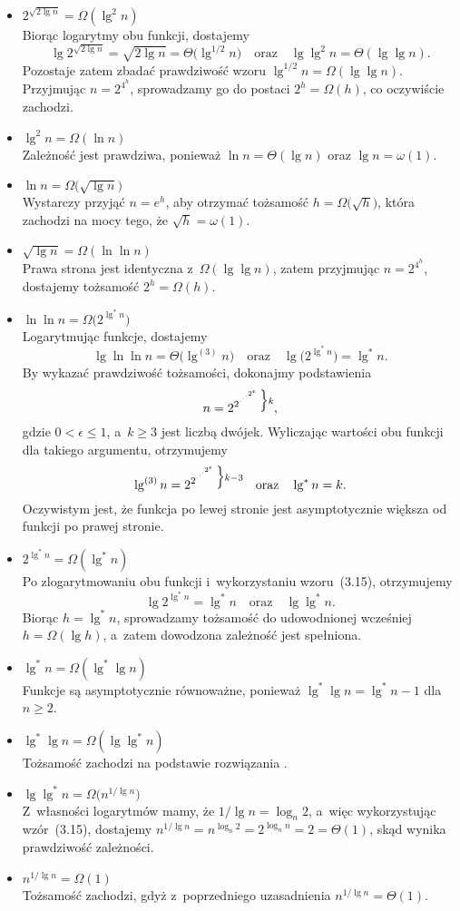 \begin{itemize}
\item $2^{\sqrt{2\lg n}}=\Omega(\lg^2 n)$ \\
	Biorąc logarytmy obu funkcji, dostajemy
	\[
		\lg2^{\sqrt{2\lg n}} = \sqrt{2\lg n} = \Theta\bigl(\lg^{1/2}n\bigr) \quad\text{oraz}\quad \lg\lg^2n = \Theta(\lg\lg n).
	\]
	Pozostaje zatem zbadać prawdziwość wzoru $\lg^{1/2}n=\Omega(\lg\lg n)$. Przyjmując $n=2^{4^h}$, sprowadzamy go do postaci $2^h=\Omega(h)$, co oczywiście zachodzi.
\item $\lg^2n=\Omega(\ln n)$ \\
	Zależność jest prawdziwa, ponieważ $\ln n=\Theta(\lg n)$ oraz $\lg n=\omega(1)$.
\item $\ln n=\Omega\bigl(\!\sqrt{\lg n}\bigr)$ \\
	Wystarczy przyjąć $n=e^h$, aby otrzymać tożsamość $h=\Omega\bigl(\!\sqrt{h}\bigr)$, która zachodzi na mocy tego, że $\sqrt{h}=\omega(1)$.
\item $\sqrt{\lg n}=\Omega(\ln\ln n)$ \\
	Prawa strona jest identyczna z~$\Omega(\lg\lg n)$, zatem przyjmując $n=2^{4^h}$, dostajemy tożsamość $2^h=\Omega(h)$.
\item $\ln\ln n=\Omega\bigl(2^{\lg^*n}\bigr)$ \\
	Logarytmując funkcje, dostajemy
	\[
		\lg\ln\ln n = \Theta\bigl(\lg^{(3)}n\bigr) \quad\text{oraz}\quad \lg\bigl(2^{\lg^*n}\bigr) = \lg^*n.
	\]
	By wykazać prawdziwość tożsamości, dokonajmy podstawienia
	\[
		n = 2^{2^{\cdot^{\cdot^{\cdot^{2^\epsilon}}}}}\vbox{\hbox{$\Big\}\scriptstyle k$}\kern0pt},
	\]
	gdzie $0<\epsilon\le1$, a~$k\ge3$ jest liczbą dwójek. Wyliczając wartości obu funkcji dla takiego argumentu, otrzymujemy
	\[
		\lg^{(3)}n = 2^{2^{\cdot^{\cdot^{\cdot^{2^\epsilon}}}}}\vbox{\hbox{$\Big\}\scriptstyle k-3$}\kern0pt} \quad\text{oraz}\quad \lg^*n=k.
	\]
	Oczywistym jest, że funkcja po lewej stronie jest asymptotycznie większa od funkcji po prawej stronie.
\item $2^{\lg^*n}=\Omega(\lg^*n)$ \\
	Po zlogarytmowaniu obu funkcji i~wykorzystaniu wzoru~(3.15), otrzymujemy
	\[
		\lg2^{\lg^*n} = \lg^*n \quad\text{oraz}\quad \lg\lg^*n.
	\]
	Biorąc $h=\lg^*n$, sprowadzamy tożsamość do udowodnionej wcześniej $h=\Omega(\lg h)$, a~zatem dowodzona zależność jest spełniona.
\item $\lg^*n=\Omega(\lg^*\lg n)$ \\
	Funkcje są asymptotycznie równoważne, ponieważ $\lg^*\lg n=\lg^*n-1$ dla $n\ge2$.
\item $\lg^*\lg n=\Omega(\lg\lg^*n)$ \\
	Tożsamość zachodzi na podstawie rozwiązania .
\item $\lg\lg^*n=\Omega\bigl(n^{1/\!\lg n}\bigr)$ \\
	Z~własności logarytmów mamy, że $1/\!\lg n=\log_n2$, a~więc wykorzystując wzór~(3.15), dostajemy $n^{1/\!\lg n}=n^{\log_n2}=2^{\log_nn}=2=\Theta(1)$, skąd wynika prawdziwość zależności.
\item $n^{1/\!\lg n}=\Omega(1)$ \\
	Tożsamość zachodzi, gdyż z~poprzedniego uzasadnienia $n^{1/\!\lg n}=\Theta(1)$.
\end{itemize}

